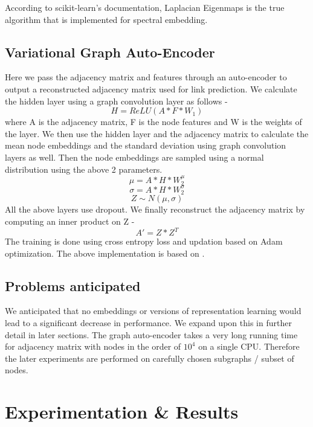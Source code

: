 \documentclass[10pt,twocolumn,letterpaper]{article}
\begin{document}
According to scikit-learn's documentation, Laplacian Eigenmaps is the true algorithm that is implemented for spectral embedding.

\subsection{Variational Graph Auto-Encoder}

Here we pass the adjacency matrix and features through an auto-encoder to output a reconstructed adjacency matrix used for link prediction. We calculate the hidden layer using a graph convolution layer as follows - 
\[
H = ReLU(A*F*W_1)
\]
where A is the adjacency matrix, F is the node features and W is the weights of the layer. We then use the hidden layer and the adjacency matrix to calculate the mean node embeddings and the standard deviation using graph convolution layers as well. Then the node embeddings are sampled using a normal distribution using the above 2 parameters.
\[
\mu = A*H*W^\mu_2
\]
\[
\sigma = A*H*W^\sigma_2
\]
\[
Z \sim N(\mu, \sigma)
\]
All the above layers use dropout. We finally reconstruct the adjacency matrix by computing an inner product on Z - 
\[
A' = Z*Z^T
\]
The training is done using cross entropy loss and updation based on Adam optimization. The above implementation is based on \cite{lucas-hu}.

\subsection{Problems anticipated}

We anticipated that no embeddings or versions of representation learning would lead to a significant decrease in performance. We expand upon this in further detail in later sections.
The graph auto-encoder takes a very long running time for adjacency matrix with nodes in the order of $10^4$ on a single CPU. Therefore the later experiments are performed on carefully chosen subgraphs / subset of nodes.




\section{Experimentation \& Results}
\end{document}
